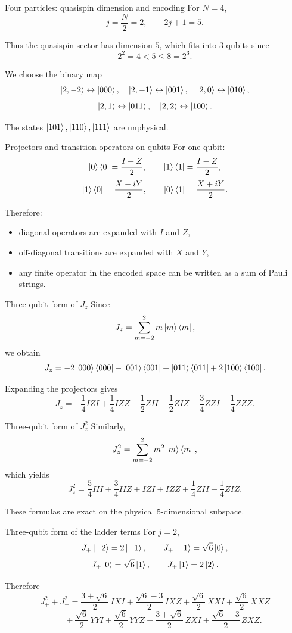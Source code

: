 \documentclass[aspectratio=169]{beamer}
\begin{document}
\begin{frame}{Four particles: quasispin dimension and encoding}
For \(N=4\),
\[
j=\frac{N}{2}=2,
\qquad
2j+1 = 5.
\]

Thus the quasispin sector has dimension \(5\), which fits into \(3\) qubits since
\[
2^2=4<5\le 8=2^3.
\]

We choose the binary map
\[
\ket{2,-2}\leftrightarrow \ket{000},\quad
\ket{2,-1}\leftrightarrow \ket{001},\quad
\ket{2,0}\leftrightarrow \ket{010},
\]
\[
\ket{2,1}\leftrightarrow \ket{011},\quad
\ket{2,2}\leftrightarrow \ket{100}.
\]

The states \(\ket{101},\ket{110},\ket{111}\) are unphysical.
\end{frame}

\begin{frame}{Projectors and transition operators on qubits}
For one qubit:
\[
\ket{0}\bra{0}=\frac{I+Z}{2},
\qquad
\ket{1}\bra{1}=\frac{I-Z}{2},
\]
\[
\ket{1}\bra{0}=\frac{X-iY}{2},
\qquad
\ket{0}\bra{1}=\frac{X+iY}{2}.
\]

Therefore:
\begin{itemize}
\item diagonal operators are expanded with \(I\) and \(Z\),
\item off-diagonal transitions are expanded with \(X\) and \(Y\),
\item any finite operator in the encoded space can be written as a sum of Pauli strings.
\end{itemize}
\end{frame}

\begin{frame}{Three-qubit form of \(J_z\)}
Since
\[
J_z = \sum_{m=-2}^2 m\ket{m}\bra{m},
\]
we obtain
\[
J_z
=
-2\ket{000}\bra{000}
-\ket{001}\bra{001}
+\ket{011}\bra{011}
+2\ket{100}\bra{100}.
\]

Expanding the projectors gives
\[
J_z
=
-\frac{1}{4} IZI
+\frac{1}{4} IZZ
-\frac{1}{2} ZII
-\frac{1}{2} ZIZ
-\frac{3}{4} ZZI
-\frac{1}{4} ZZZ.
\]
\end{frame}

\begin{frame}{Three-qubit form of \(J_z^2\)}
Similarly,
\[
J_z^2 = \sum_{m=-2}^2 m^2 \ket{m}\bra{m},
\]
which yields
\[
J_z^2
=
\frac{5}{4} III
+\frac{3}{4} IIZ
+IZI
+IZZ
+\frac{1}{4} ZII
-\frac{1}{4} ZIZ.
\]

These formulas are exact on the physical 5-dimensional subspace.
\end{frame}

\begin{frame}{Three-qubit form of the ladder terms}
For \(j=2\),
\[
J_+\ket{-2}=2\ket{-1},\qquad
J_+\ket{-1}=\sqrt{6}\ket{0},
\]
\[
J_+\ket{0}=\sqrt{6}\ket{1},\qquad
J_+\ket{1}=2\ket{2}.
\]

Therefore
\[
J_+^2+J_-^2
=
\frac{3+\sqrt{6}}{2}\,IXI
+\frac{\sqrt{6}-3}{2}\,IXZ
+\frac{\sqrt{6}}{2}\,XXI
+\frac{\sqrt{6}}{2}\,XXZ
\]
\[
\qquad
+\frac{\sqrt{6}}{2}\,YYI
+\frac{\sqrt{6}}{2}\,YYZ
+\frac{3+\sqrt{6}}{2}\,ZXI
+\frac{\sqrt{6}-3}{2}\,ZXZ.
\]
\end{frame}
\end{document}
